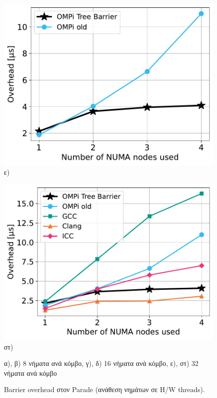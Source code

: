 \begin{figure}[htbp]
\begin{minipage}{0.5\textwidth}
        \includegraphics[width=1\textwidth]{Figures/parade-epcc/ompionly_topothreads_tpn-32_close.pdf}
        ε)
    \end{minipage}\hfill
    \begin{minipage}{0.5\textwidth}
        \centering
        \includegraphics[width=1\textwidth]{Figures/parade-epcc/topothreads_tpn-32_close.pdf}
        στ)
    \end{minipage}
    \newline \newline
    {\small α), β) 8 νήματα ανά κόμβο, γ), δ) 16 νήματα ανά κόμβο, ε), στ) 32 νήματα ανά κόμβο}
    \caption{Barrier overhead στον Parade (ανάθεση νημάτων σε H/W threads).}
    \label{fig:bo-parade-topothreads}
\end{figure}

